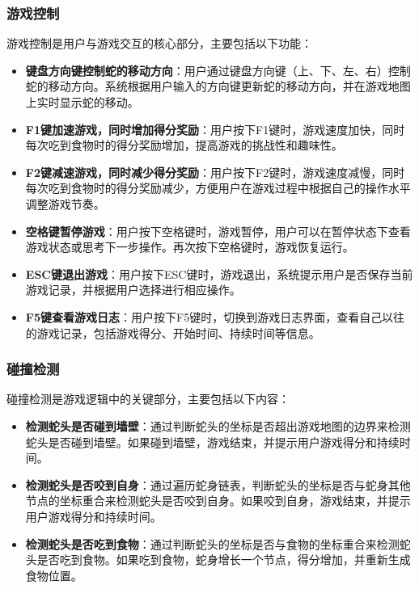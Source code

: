 \documentclass{article}
\begin{document}
\subsubsection{游戏控制}
游戏控制是用户与游戏交互的核心部分，主要包括以下功能：
\begin{itemize}
    \item \textbf{键盘方向键控制蛇的移动方向}：用户通过键盘方向键（上、下、左、右）控制蛇的移动方向。系统根据用户输入的方向键更新蛇的移动方向，并在游戏地图上实时显示蛇的移动。
    \item \textbf{F1键加速游戏，同时增加得分奖励}：用户按下F1键时，游戏速度加快，同时每次吃到食物时的得分奖励增加，提高游戏的挑战性和趣味性。
    \item \textbf{F2键减速游戏，同时减少得分奖励}：用户按下F2键时，游戏速度减慢，同时每次吃到食物时的得分奖励减少，方便用户在游戏过程中根据自己的操作水平调整游戏节奏。
    \item \textbf{空格键暂停游戏}：用户按下空格键时，游戏暂停，用户可以在暂停状态下查看游戏状态或思考下一步操作。再次按下空格键时，游戏恢复运行。
    \item \textbf{ESC键退出游戏}：用户按下ESC键时，游戏退出，系统提示用户是否保存当前游戏记录，并根据用户选择进行相应操作。
    \item \textbf{F5键查看游戏日志}：用户按下F5键时，切换到游戏日志界面，查看自己以往的游戏记录，包括游戏得分、开始时间、持续时间等信息。
\end{itemize}

\subsubsection{碰撞检测}
碰撞检测是游戏逻辑中的关键部分，主要包括以下内容：
\begin{itemize}
    \item \textbf{检测蛇头是否碰到墙壁}：通过判断蛇头的坐标是否超出游戏地图的边界来检测蛇头是否碰到墙壁。如果碰到墙壁，游戏结束，并提示用户游戏得分和持续时间。
    \item \textbf{检测蛇头是否咬到自身}：通过遍历蛇身链表，判断蛇头的坐标是否与蛇身其他节点的坐标重合来检测蛇头是否咬到自身。如果咬到自身，游戏结束，并提示用户游戏得分和持续时间。
    \item \textbf{检测蛇头是否吃到食物}：通过判断蛇头的坐标是否与食物的坐标重合来检测蛇头是否吃到食物。如果吃到食物，蛇身增长一个节点，得分增加，并重新生成食物位置。
\end{itemize}
\end{document}
